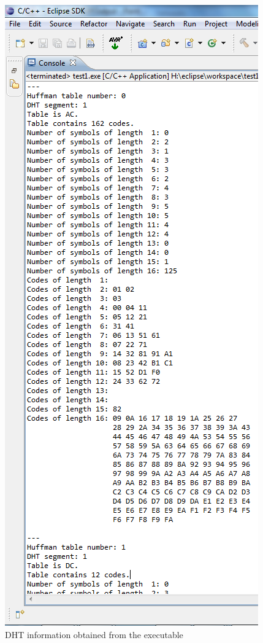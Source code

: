 \begin{figure}[!hbtp]
\begin{center}
\includegraphics[scale=0.5]{figures/DHTOutput.png} 
\end{center}
\caption{DHT information obtained from the executable}
\end{figure}

